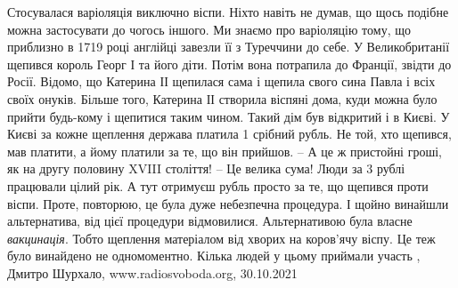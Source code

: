 Стосувалася варіоляція виключно віспи. Ніхто навіть не думав, що щось подібне
можна застосувати до чогось іншого. Ми знаємо про варіоляцію тому, що приблизно
в 1719 році англійці завезли її з Туреччини до себе. У Великобританії щепився
король Георг І та його діти. Потім вона потрапила до Франції, звідти до Росії.
Відомо, що Катерина ІІ щепилася сама і щепила свого сина Павла і всіх своїх
онуків. Більше того, Катерина ІІ створила віспяні дома, куди можна було прийти
будь-кому і щепитися таким чином. Такий дім був відкритий і в Києві. У Києві за
кожне щеплення держава платила 1 срібний рубль. Не той, хто щепився, мав
платити, а йому платили за те, що він прийшов.
– А це ж пристойні гроші, як на другу половину XVIII століття!
– Це велика сума! Люди за 3 рублі працювали цілий рік. А тут отримуєш рубль
просто за те, що щепився проти віспи. Проте, повторюю, це була дуже небезпечна
процедура. І щойно винайшли альтернатива, від цієї процедури відмовилися.
Альтернативою була власне \emph{вакцинація}. Тобто щеплення матеріалом від хворих на
коров’ячу віспу. Це теж було винайдено не одномоментно. Кілька людей у цьому
приймали участь
, 
Дмитро Шурхало, www.radiosvoboda.org, 30.10.2021

